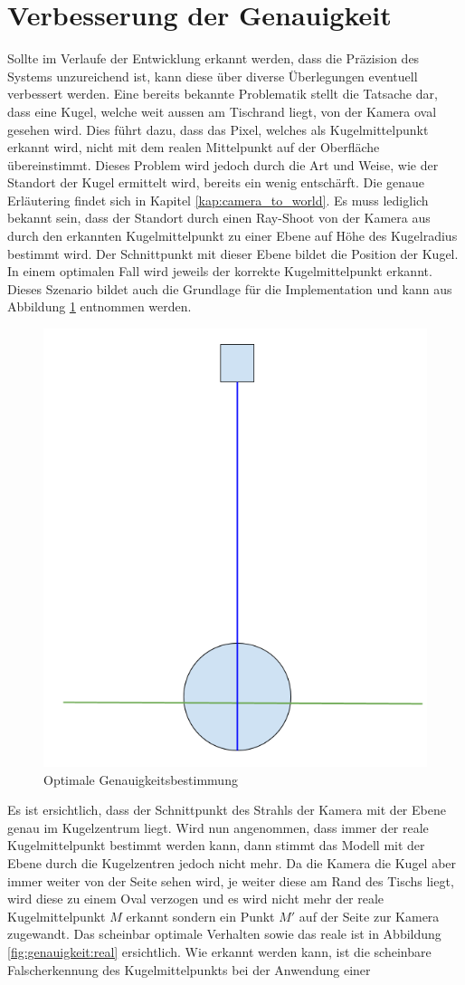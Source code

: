 \section{Verbesserung der Genauigkeit}
Sollte im Verlaufe der Entwicklung erkannt werden, dass die Präzision des Systems unzureichend
ist, kann diese über diverse Überlegungen eventuell verbessert werden. Eine bereits bekannte Problematik
stellt die Tatsache dar, dass eine Kugel, welche weit aussen am Tischrand liegt, von der Kamera oval gesehen wird.
Dies führt dazu, dass das Pixel, welches als Kugelmittelpunkt erkannt wird, nicht mit dem realen Mittelpunkt auf der Oberfläche übereinstimmt.
Dieses Problem wird jedoch durch die Art und Weise, wie der Standort der Kugel ermittelt wird, bereits ein wenig entschärft.
Die genaue Erläutering findet sich in Kapitel \ref{kap:camera_to_world}.
Es muss lediglich bekannt sein, dass der Standort durch einen Ray-Shoot von der Kamera aus durch den erkannten Kugelmittelpunkt
zu einer Ebene auf Höhe des Kugelradius bestimmt wird. Der Schnittpunkt mit dieser Ebene bildet die Position der Kugel. In einem optimalen Fall
wird jeweils der korrekte Kugelmittelpunkt erkannt. Dieses Szenario bildet auch die Grundlage für die Implementation und kann
aus Abbildung \ref{fig:genauigkeit:optimal} entnommen werden.
\begin{figure}[h!]
    \includegraphics[width=0.2\linewidth]{../common/05_further_work/resources/00_genauigkeit_optimal.png}
    \caption{Optimale Genauigkeitsbestimmung}
    \label{fig:genauigkeit:optimal}
\end{figure}
Es ist ersichtlich, dass der Schnittpunkt des Strahls der Kamera mit der Ebene genau im Kugelzentrum liegt.
Wird nun angenommen, dass immer der reale Kugelmittelpunkt bestimmt werden kann, dann stimmt das Modell mit der Ebene
durch die Kugelzentren jedoch nicht mehr. Da die Kamera die Kugel aber immer weiter von der Seite sehen wird, je weiter diese am Rand
des Tischs liegt, wird diese zu einem Oval verzogen und es wird nicht mehr der reale Kugelmittelpunkt $M$ erkannt sondern ein Punkt $M'$
auf der Seite zur Kamera zugewandt. Das scheinbar optimale Verhalten sowie das reale ist in Abbildung \ref{fig:genauigkeit:real}
ersichtlich. Wie erkannt werden kann, ist die scheinbare Falscherkennung des Kugelmittelpunkts bei der Anwendung einer
